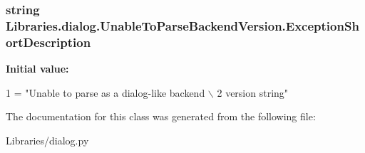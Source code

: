 \subsubsection[{\texorpdfstring{Exception\+Short\+Description}{ExceptionShortDescription}}]{\setlength{\rightskip}{0pt plus 5cm}string Libraries.\+dialog.\+Unable\+To\+Parse\+Backend\+Version.\+Exception\+Short\+Description\hspace{0.3cm}{\ttfamily [static]}}\hypertarget{class_libraries_1_1dialog_1_1_unable_to_parse_backend_version_a09aa09059939666fd32ef1ff1b065468}{}\label{class_libraries_1_1dialog_1_1_unable_to_parse_backend_version_a09aa09059939666fd32ef1ff1b065468}
{\bfseries Initial value\+:}
\begin{DoxyCode}
1 = \textcolor{stringliteral}{"Unable to parse as a dialog-like backend \(\backslash\)}
2 \textcolor{stringliteral}{version string"}
\end{DoxyCode}


The documentation for this class was generated from the following file\+:\begin{DoxyCompactItemize}
\item 
Libraries/dialog.\+py\end{DoxyCompactItemize}
